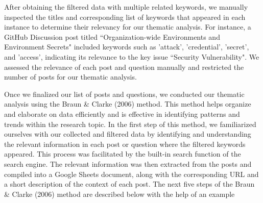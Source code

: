 \documentclass[conference]{IEEEtran}
\begin{document}
               After obtaining the filtered data with multiple related keywords, we manually inspected the titles and corresponding list of keywords that appeared in each instance to determine their relevancy for our thematic analysis. For instance, a GitHub Discussion post titled “Organization-wide Environments and Environment Secrets" included keywords such as 'attack', 'credential', 'secret', and 'access', indicating its relevance to the key issue “Security Vulnerability". We assessed the relevance of each post and question manually and restricted the number of posts for our thematic analysis.


	Once we finalized our list of posts and questions, we conducted our thematic analysis using the Braun \& Clarke (2006) method. This method helps organize and elaborate on data efficiently and is effective in identifying patterns and trends within the research topic. In the first step of this method, we familiarized ourselves with our collected and filtered data by identifying and understanding the relevant information in each post or question where the filtered keywords appeared. This process was facilitated by the built-in search function of the search engine. The relevant information was then extracted from the posts and compiled into a Google Sheets document, along with the corresponding URL and a short description of the context of each post. The next five steps of the Braun \& Clarke (2006) method are described below with the help of an example
\end{document}

